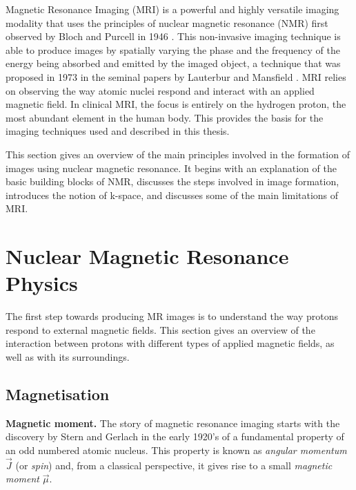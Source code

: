 
Magnetic Resonance Imaging (MRI) is a powerful and highly versatile imaging 
modality that uses the principles of nuclear magnetic resonance (NMR) 
first observed by Bloch and Purcell in 1946 \cite{Bloch1946} 
\cite{Purcell1946}.
This non-invasive imaging technique is able to produce images by spatially 
varying the phase and the frequency of the energy being absorbed and 
emitted by the imaged object, a technique that was proposed in 1973 
in the seminal papers by Lauterbur \cite{Lauterbur1973} and Mansfield \cite{Mansfield1973}. 
MRI relies on observing the way atomic nuclei 
respond and interact with an applied magnetic field. 
In clinical MRI, the focus is entirely on the hydrogen proton, 
the most abundant element in the human body. 
This provides the basis for the imaging techniques used and described in this thesis.

\hfill

This section gives an overview of the main principles involved in the 
formation of images using nuclear magnetic resonance. 
It begins with an explanation of the basic building blocks of NMR, %
discusses the steps involved in image formation, %
introduces the notion of k-space, %
and discusses some of the main limitations of MRI.

\section{Nuclear Magnetic Resonance Physics}\label{chapterlabel2sec11}
The first step towards producing MR images is to understand the way protons respond to
external magnetic fields. 
This section gives an overview of the interaction between protons with different types of applied magnetic fields, as well as with its surroundings.

\hfill

\subsection{Magnetisation}

\textbf{Magnetic moment.}
The story of magnetic resonance imaging starts with the discovery 
by Stern and Gerlach in the early 1920's of a fundamental property of an 
odd numbered atomic nucleus. This property is known as \textit{angular momentum $\vec{J}$} (or \textit{spin}) and, from a classical perspective, it gives rise to a small \textit{magnetic moment} $\vec{\mu}$. 

